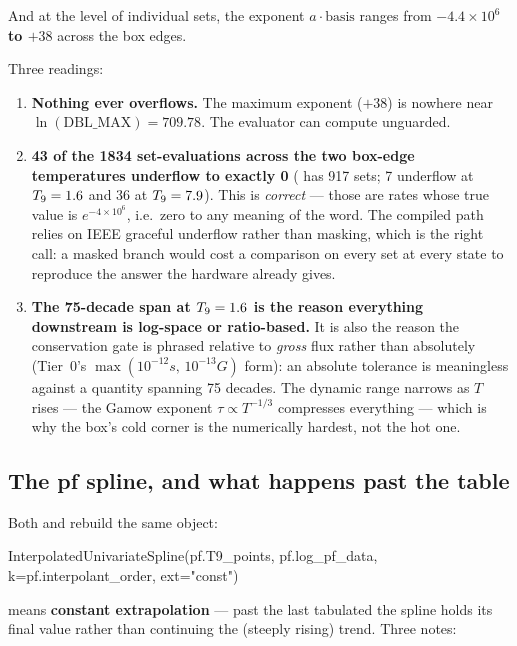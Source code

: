 And at the level of individual sets, the exponent $a\cdot\text{basis}$ ranges
from \textbf{$-4.4\times10^6$ to $+38$} across the box edges.

Three readings:

\begin{enumerate}
\item \textbf{Nothing ever overflows.} The maximum exponent ($+38$) is nowhere
      near $\ln(\text{DBL\_MAX}) = 709.78$. The evaluator can compute 
      unguarded.
\item \textbf{43 of the 1834 set-evaluations across the two box-edge
      temperatures underflow to exactly 0} ( has 917 sets; 7 underflow
      at $T_{9} = 1.6$ and 36 at $T_{9} = 7.9$). This is \emph{correct} --- those
      are rates whose true value is $e^{-4\times10^6}$, i.e.\ zero to any
      meaning of the word. The compiled path relies on IEEE graceful underflow
      rather than masking, which is the right call: a masked branch would cost a
      comparison on every set at every state to reproduce the answer the
      hardware already gives.
\item \textbf{The 75-decade span at $T_{9} = 1.6$ is the reason everything
      downstream is log-space or ratio-based.} It is also the reason the
      conservation gate is phrased relative to \emph{gross} flux rather than
      absolutely (Tier~0's $\max(10^{-12}s,\,10^{-13}G)$ form): an absolute
      tolerance is meaningless against a quantity spanning 75 decades. The
      dynamic range narrows as $T$ rises --- the Gamow exponent
      $\tau \propto T^{-1/3}$ compresses everything --- which is why the box's
      cold corner is the numerically hardest, not the hot one.
\end{enumerate}

\subsection{The pf spline, and what happens past the table}
\label{sec:pf-spline}

Both  and  rebuild the same object:

\begin{srclisting}
InterpolatedUnivariateSpline(pf.T9_points, pf.log_pf_data,
                             k=pf.interpolant_order, ext="const")
\end{srclisting}

 means \textbf{constant extrapolation} --- past the last
tabulated \Tn{} the spline holds its final value rather than continuing the
(steeply rising) trend. Three notes:

